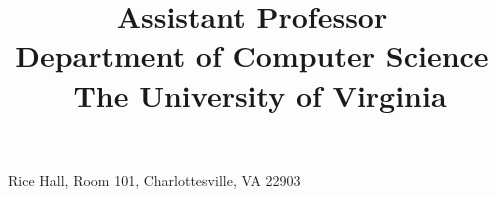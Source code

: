 \title{\large Assistant Professor~\\Department of Computer Science~\\The University of Virginia}
\address{The University of Virginia}{}{Rice Hall, Room 101, Charlottesville, VA 22903}

\renewcommand{\emaillink}[1]{#1} %

